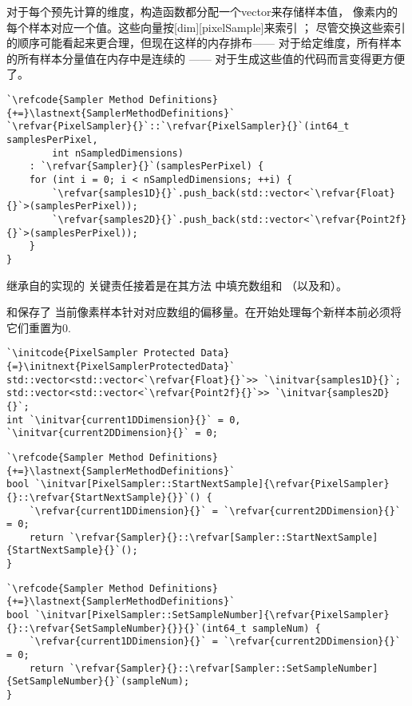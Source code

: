 对于每个预先计算的维度，构造函数都分配一个{\ttfamily vector}来存储样本值，
像素内的每个样本对应一个值。这些向量按{\ttfamily{}[dim][pixelSample]}来索引
；
尽管交换这些索引的顺序可能看起来更合理，但现在这样的内存排布——
对于给定维度，所有样本的所有样本分量值在内存中是连续的
——
对于生成这些值的代码而言变得更方便了。
\begin{lstlisting}
`\refcode{Sampler Method Definitions}{+=}\lastnext{SamplerMethodDefinitions}`
`\refvar{PixelSampler}{}`::`\refvar{PixelSampler}{}`(int64_t samplesPerPixel,
        int nSampledDimensions)
    : `\refvar{Sampler}{}`(samplesPerPixel) {
    for (int i = 0; i < nSampledDimensions; ++i) {
        `\refvar{samples1D}{}`.push_back(std::vector<`\refvar{Float}{}`>(samplesPerPixel));
        `\refvar{samples2D}{}`.push_back(std::vector<`\refvar{Point2f}{}`>(samplesPerPixel));
    }
}
\end{lstlisting}

继承自的实现的
关键责任接着是在其方法
中填充数组和
（以及和）。

和保存了
当前像素样本针对对应数组的偏移量。在开始处理每个新样本前必须将它们重置为0.
\begin{lstlisting}
`\initcode{PixelSampler Protected Data}{=}\initnext{PixelSamplerProtectedData}`
std::vector<std::vector<`\refvar{Float}{}`>> `\initvar{samples1D}{}`;
std::vector<std::vector<`\refvar{Point2f}{}`>> `\initvar{samples2D}{}`;
int `\initvar{current1DDimension}{}` = 0, `\initvar{current2DDimension}{}` = 0;
\end{lstlisting}
\begin{lstlisting}
`\refcode{Sampler Method Definitions}{+=}\lastnext{SamplerMethodDefinitions}`
bool `\initvar[PixelSampler::StartNextSample]{\refvar{PixelSampler}{}::\refvar{StartNextSample}{}}`() {
    `\refvar{current1DDimension}{}` = `\refvar{current2DDimension}{}` = 0;
    return `\refvar{Sampler}{}::\refvar[Sampler::StartNextSample]{StartNextSample}{}`();
}
\end{lstlisting}
\begin{lstlisting}
`\refcode{Sampler Method Definitions}{+=}\lastnext{SamplerMethodDefinitions}`
bool `\initvar[PixelSampler::SetSampleNumber]{\refvar{PixelSampler}{}::\refvar{SetSampleNumber}{}}{}`(int64_t sampleNum) {
    `\refvar{current1DDimension}{}` = `\refvar{current2DDimension}{}` = 0;
    return `\refvar{Sampler}{}::\refvar[Sampler::SetSampleNumber]{SetSampleNumber}{}`(sampleNum);
}
\end{lstlisting}

